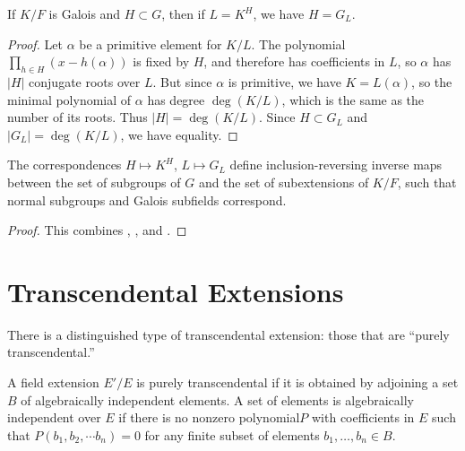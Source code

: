 \begin{corollary}
 If $K/F$ is Galois and $H \subset G$, then if $L = K^H$, we have $H = G_L$.
 \label{fixing_subgroup}
\end{corollary}

\begin{proof}
 Let $\alpha$ be a primitive element for $K/L$.  The polynomial $\prod_{h \in H} (x - h(\alpha))$ is fixed by $H$, and therefore has coefficients in $L$, so $\alpha$ has $|H|$ conjugate roots over $L$.  But since $\alpha$ is primitive, we have $K = L(\alpha)$, so the minimal polynomial of $\alpha$ has degree $\deg(K/L)$, which is the same as the number of its roots.  Thus $|H| = \deg(K/L)$.  Since $H \subset G_L$ and $|G_L| = \deg(K/L)$, we have equality.
\end{proof}


\begin{theorem} The correspondences $H \mapsto K^H$, $L \mapsto G_L$ define
inclusion-reversing inverse maps between the set of subgroups of $G$ and the
set of subextensions of $K/F$, such that normal subgroups and Galois subfields
correspond.
\label{fundamental_theorem}
\end{theorem}

\begin{proof} This combines , , and .
\end{proof}


\section{Transcendental Extensions}


There is a distinguished type of transcendental extension: those that are
``purely transcendental.'' 
\begin{definition} A field extension $E'/E$ is purely transcendental if it is
obtained by adjoining a set $B$ of algebraically independent elements. A set of
elements is algebraically independent over $E$ if there is no nonzero polynomial$P$
with coefficients in $E$ such
that $P(b_1,b_2,\cdots b_n)=0$ for any finite subset of elements $b_1, \dots,
b_n \in B$.
\end{definition}

